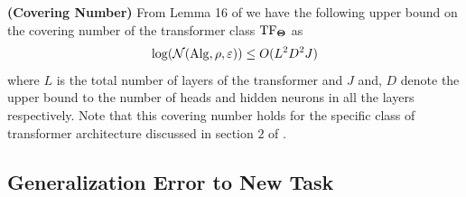 \begin{remark}\textbf{(Covering Number)} 
\label{remark:covering-number}
From Lemma 16 of \citet{lin2023transformers} we have the following upper bound on the covering number of the transformer class $\mathrm{TF}_{\mathbf{\Theta}}$ as 
\begin{align*}
    \log(\mathcal{N}(\mathrm{Alg}, \rho, \varepsilon))\leq O(L^2D^2J)
\end{align*}
where $L$ is the total number of layers of the transformer and $J$ and, $D$ denote the upper bound to the number of heads and hidden neurons in all the layers respectively. Note that this covering number holds for the specific class of transformer architecture discussed in section $2$ of \citep{lin2023transformers}.
%
%
\end{remark}

\subsection{Generalization Error to New Task}
\label{app:transfer}


